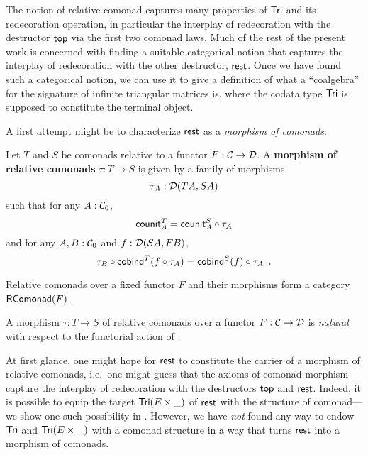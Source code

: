 \documentclass{amsart}
\newcommand{\fat}[1]{\textbf{#1}}
\begin{document}
The notion of relative comonad captures many properties of $\Tri$ and its redecoration operation, in particular the interplay
of redecoration with the destructor $\head$ via the first two comonad laws.
Much of the rest of the present work is concerned with finding a suitable categorical notion that captures the interplay 
of redecoration with the other destructor, $\tail$. Once we have found such a categorical notion, we can use 
it to give a definition of what a \enquote{coalgebra} for the signature of infinite triangular matrices is, 
where the codata type $\Tri$ is supposed to constitute the terminal object.

A first attempt might be to characterize $\tail$ as a \emph{morphism of comonads}:


\begin{definition}\label{def:comonad_morphism}
 Let $T$ and $S$ be comonads relative to a functor $F : \C \to \D$. A \fat{morphism of relative comonads} $\tau : T \to S$
  is given by a family of morphisms \[\tau_A : \D(TA,SA)\] such that for any $A : \C_0$,
     \[  \counit^T_A = \comp{\tau_A}{\counit^S_A} \]
   and for any $A,B : \C_0$ and $f : \D(SA,FB)$,
   \[  \comp{\cobind^T(\comp{\tau_A}{f})}{\tau_B} = \comp{\tau_A}{\cobind^S(f)} \enspace .  \]
\end{definition}

Relative comonads over a fixed functor $F$ and their morphisms form a category $\RComonad(F)$.

\begin{remark}
A morphism $\tau : T\to S$ of relative comonads over a functor $F:\C\to\D$ is  \emph{natural}
with respect to the functorial action of .
\end{remark}




At first glance, one might hope for $\tail$ to constitute the carrier of a morphism of relative comonads, i.e.\ one might 
guess that the axioms of comonad morphism capture the interplay of redecoration with the destructors $\head$ and $\tail$.
Indeed, it is possible to equip the target $\Tri(E\times \_)$ of $\tail$ with the structure of comonad---we show one such
possibility in . However, we have \emph{not} found any way to endow $\Tri$ and $\Tri(E\times \_)$ with a comonad structure in a way
that turns $\tail$ into a morphism of comonads.
\end{document}
